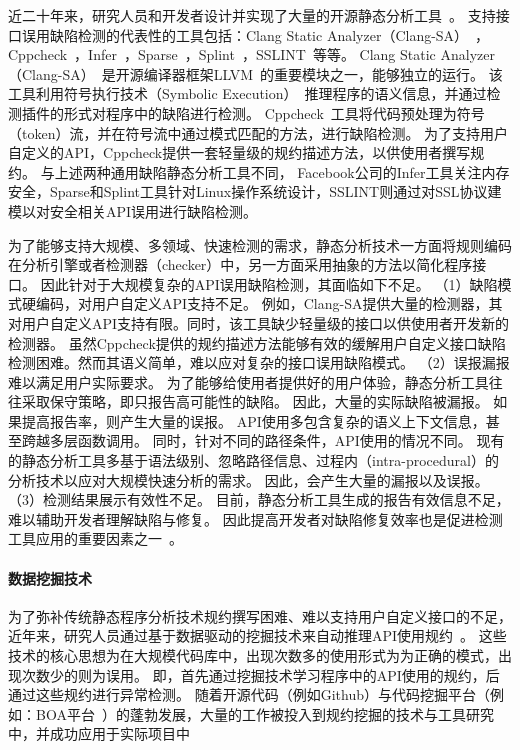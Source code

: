 近二十年来，研究人员和开发者设计并实现了大量的开源静态分析工具~\cite{wiki-static-tool}。
支持接口误用缺陷检测的代表性的工具包括：Clang Static Analyzer（Clang-SA）~\cite{clang-sa}， Cppcheck~\cite{cppcheck}，Infer~\cite{infer}，Sparse~\cite{sparse}，Splint~\cite{splint}，SSLINT~\cite{15-sp-sslint}等等。
Clang Static Analyzer（Clang-SA）~\cite{clang-sa}是开源编译器框架LLVM~\cite{llvm}的重要模块之一，能够独立的运行。
该工具利用符号执行技术（Symbolic Execution）~\cite{13-acm-se}推理程序的语义信息，并通过检测插件的形式对程序中的缺陷进行检测。
Cppcheck~\cite{cppcheck}工具将代码预处理为符号（token）流，并在符号流中通过模式匹配的方法，进行缺陷检测。
为了支持用户自定义的API，Cppcheck提供一套轻量级的规约描述方法，以供使用者撰写规约。
与上述两种通用缺陷静态分析工具不同，
Facebook公司的Infer工具关注内存安全，Sparse和Splint工具针对Linux操作系统设计，SSLINT则通过对SSL协议建模以对安全相关API误用进行缺陷检测。


为了能够支持大规模、多领域、快速检测的需求，静态分析技术一方面将规则编码在分析引擎或者检测器（checker）中，另一方面采用抽象的方法以简化程序接口。
因此针对于大规模复杂的API误用缺陷检测，其面临如下不足。
（1）缺陷模式硬编码，对用户自定义API支持不足。
例如，Clang-SA提供大量的检测器，其对用户自定义API支持有限。同时，该工具缺少轻量级的接口以供使用者开发新的检测器。
虽然Cppcheck提供的规约描述方法能够有效的缓解用户自定义接口缺陷检测困难。然而其语义简单，难以应对复杂的接口误用缺陷模式。
（2）误报漏报难以满足用户实际要求。
为了能够给使用者提供好的用户体验，静态分析工具往往采取保守策略，即只报告高可能性的缺陷。
因此，大量的实际缺陷被漏报。
如果提高报告率，则产生大量的误报。
API使用多包含复杂的语义上下文信息，甚至跨越多层函数调用。
同时，针对不同的路径条件，API使用的情况不同。
现有的静态分析工具多基于语法级别、忽略路径信息、过程内（intra-procedural）的分析技术以应对大规模快速分析的需求。
因此，会产生大量的漏报以及误报。
（3）检测结果展示有效性不足。
目前，静态分析工具生成的报告有效信息不足，难以辅助开发者理解缺陷与修复。
因此提高开发者对缺陷修复效率也是促进检测工具应用的重要因素之一~\cite{13-icse-donotuse}。

\paragraph{数据挖掘技术}
为了弥补传统静态程序分析技术规约撰写困难、难以支持用户自定义接口的不足，近年来，研究人员通过基于数据驱动的挖掘技术来自动推理API使用规约~\cite{13survey}。
这些技术的核心思想为在大规模代码库中，出现次数多的使用形式为为正确的模式，出现次数少的则为误用。
即，首先通过挖掘技术学习程序中的API使用的规约，后通过这些规约进行异常检测。
随着开源代码（例如Github）与代码挖掘平台（例如：BOA平台~\cite{15-tosem-boa}）的蓬勃发展，大量的工作被投入到规约挖掘的技术与工具研究中，并成功应用于实际项目中~\cite{survey18}

